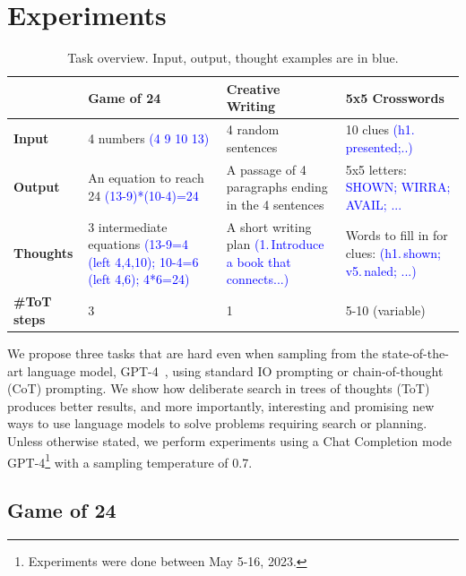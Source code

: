 \documentclass{article}
\begin{document}
\section{Experiments}

\begin{table}[ht]
  \centering
  \begin{tabularx}{\textwidth}{l|XXX}
    \toprule
     &  \textbf{Game of 24} & \textbf{Creative Writing} & \textbf{5x5 Crosswords} \\
    \midrule
    \textbf{\small Input} & 4 numbers {\textcolor{blue}{(4 9 10 13)}}  & 4 random sentences & 10 clues {\textcolor{blue}{(h1.\,presented;..)}}\\
    \midrule
    \textbf{\small Output} & An equation to reach 24 {\textcolor{blue}{(13-9)*(10-4)=24}} & A passage of 4 paragraphs ending in the 4 sentences  & 5x5 letters: {\textcolor{blue}{SHOWN; WIRRA; AVAIL; ...}} \\
    \midrule
    \textbf{\small Thoughts} & 3 intermediate equations {\textcolor{blue}{(13-9=4 (left 4,4,10); 10-4=6 (left 4,6); 4*6=24)}} & A short writing plan {\textcolor{blue}{(1.\,Introduce a book that connects...)}} & Words to fill in for clues: {\textcolor{blue}{(h1.\,shown; v5.\,naled; ...)}}  \\
    \midrule
    \textbf{\small \#ToT steps} & 3 & 1 & 5-10 (variable) \\
    \bottomrule
  \end{tabularx}
\caption{Task overview. Input, output, thought examples are in blue. }
\label{tab:overview}
\vspace{-18pt}
\end{table}


We propose three tasks that are hard even when sampling from the state-of-the-art language model, GPT-4~\citep{OpenAI2023GPT4TR}, using standard IO prompting or chain-of-thought (CoT) prompting. We show how deliberate search in trees of thoughts (ToT) produces better results, and more importantly, interesting and promising new ways to use language models to solve problems requiring search or planning. 
Unless otherwise stated, we perform experiments using a Chat Completion mode GPT-4\footnote{Experiments were done between May 5-16, 2023.} with a sampling temperature of 0.7. 


\subsection{Game of 24}
\end{document}
